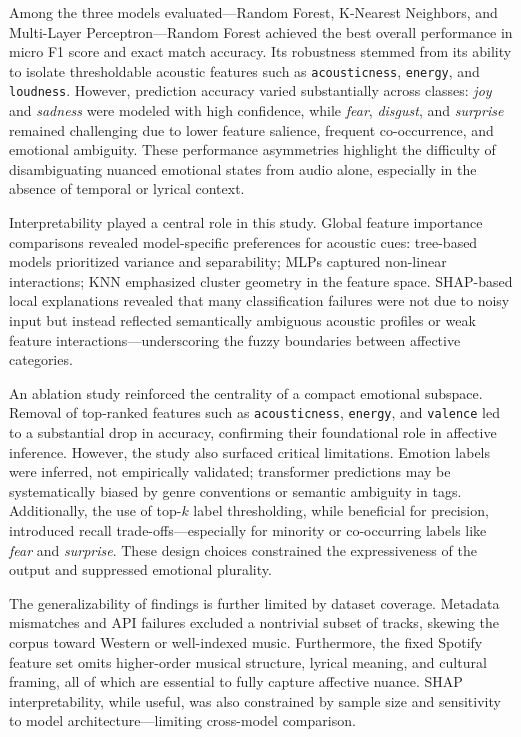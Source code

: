 \documentclass{article}
\begin{document}
Among the three models evaluated—Random Forest, K-Nearest Neighbors, and Multi-Layer Perceptron—Random Forest achieved the best overall performance in micro F1 score and exact match accuracy. Its robustness stemmed from its ability to isolate thresholdable acoustic features such as \texttt{acousticness}, \texttt{energy}, and \texttt{loudness}. However, prediction accuracy varied substantially across classes: \textit{joy} and \textit{sadness} were modeled with high confidence, while \textit{fear}, \textit{disgust}, and \textit{surprise} remained challenging due to lower feature salience, frequent co-occurrence, and emotional ambiguity. These performance asymmetries highlight the difficulty of disambiguating nuanced emotional states from audio alone, especially in the absence of temporal or lyrical context.

Interpretability played a central role in this study. Global feature importance comparisons revealed model-specific preferences for acoustic cues: tree-based models prioritized variance and separability; MLPs captured non-linear interactions; KNN emphasized cluster geometry in the feature space. SHAP-based local explanations revealed that many classification failures were not due to noisy input but instead reflected semantically ambiguous acoustic profiles or weak feature interactions—underscoring the fuzzy boundaries between affective categories.

An ablation study reinforced the centrality of a compact emotional subspace. Removal of top-ranked features such as \texttt{acousticness}, \texttt{energy}, and \texttt{valence} led to a substantial drop in accuracy, confirming their foundational role in affective inference. However, the study also surfaced critical limitations. Emotion labels were inferred, not empirically validated; transformer predictions may be systematically biased by genre conventions or semantic ambiguity in tags. Additionally, the use of top-$k$ label thresholding, while beneficial for precision, introduced recall trade-offs—especially for minority or co-occurring labels like \textit{fear} and \textit{surprise}. These design choices constrained the expressiveness of the output and suppressed emotional plurality.

The generalizability of findings is further limited by dataset coverage. Metadata mismatches and API failures excluded a nontrivial subset of tracks, skewing the corpus toward Western or well-indexed music. Furthermore, the fixed Spotify feature set omits higher-order musical structure, lyrical meaning, and cultural framing, all of which are essential to fully capture affective nuance. SHAP interpretability, while useful, was also constrained by sample size and sensitivity to model architecture—limiting cross-model comparison.
\end{document}
